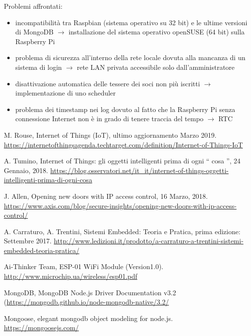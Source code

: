 \documentclass[11pt]{article}
\begin{document}
	\noindent Problemi affrontati:
	\begin{itemize}
		\item incompatibilità tra Raspbian (sistema operativo su 32 bit) e le ultime versioni di MongoDB $\rightarrow$ installazione del sistema operativo openSUSE (64 bit) sulla Raspberry Pi
		\item problema di sicurezza all'interno della rete locale dovuta alla mancanza di un sistema di login $\rightarrow$ rete LAN privata accessibile solo dall'amministratore
		\item disattivazione automatica delle tessere dei soci non più iscritti $\rightarrow$ implementazione di uno scheduler
		\item problema dei timestamp nei log dovuto al fatto che la Raspberry Pi senza connessione Internet non è in grado di tenere traccia del tempo $\rightarrow$ RTC
	\end{itemize}

\begin{thebibliography}{00}
	M. Rouse, Internet of Things (IoT), ultimo aggiornamento Marzo 2019.
	\url{https://internetofthingsagenda.techtarget.com/definition/Internet-of-Things-IoT}
	
	A. Tumino, Internet of Things: gli oggetti intelligenti prima di ogni \textquotedblleft{} cosa \textquotedblright{}, 24 Gennaio, 2018.
	\url{https://blog.osservatori.net/it\_it/internet-of-things-oggetti-intelligenti-prima-di-ogni-cosa}

	J. Allen, Opening new doors with IP access control, 16 Marzo, 2018. \url{https://www.axis.com/blog/secure-insights/opening-new-doors-with-ip-access-control/}
	
	A. Carraturo, A. Trentini, Sistemi Embedded: Teoria e Pratica, prima edizione: Settembre 2017.
	\url{http://www.ledizioni.it/prodotto/a-carraturo-a-trentini-sistemi-embedded-teoria-pratica/}
	
	Ai-Thinker Team, ESP-01 WiFi Module (Version1.0).
	\url{http://www.microchip.ua/wireless/esp01.pdf}
	
	MongoDB, MongoDB Node.js Driver Documentation v3.2
	(\url{https://mongodb.github.io/node-mongodb-native/3.2/}
	
	Mongoose, elegant mongodb object modeling for node.js.
	\url{https://mongoosejs.com/}
	
\end{thebibliography}
	
\end{document}
